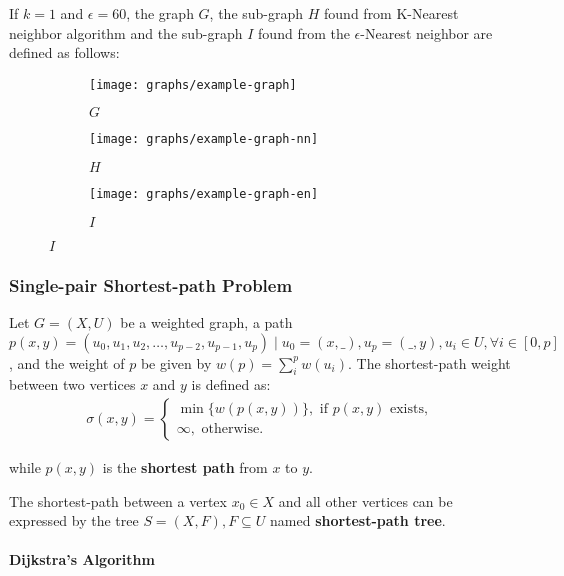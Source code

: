 \begin{example}
	If $k=1$ and $\epsilon=60$, the graph $G$, the sub-graph $H$ found from K-Nearest neighbor algorithm and the sub-graph $I$ found from the $\epsilon$-Nearest neighbor are defined as follows:
	\begin{figure}[H]
		\begin{subfigure}{.33\linewidth}
			\centering
			\texttt{[image: graphs/example-graph]}
			\caption{$G$}
			\label{fig:example-graph}
		\end{subfigure}%
		\begin{subfigure}{.33\linewidth}
			\centering
			\texttt{[image: graphs/example-graph-nn]}
			\caption{$H$}
			\label{fig:example-graph-nn}
		\end{subfigure}%
		\begin{subfigure}{.33\linewidth}
			\centering
			\texttt{[image: graphs/example-graph-en]}
			\caption{$I$}
			\label{fig:example-graph-en}
		\end{subfigure}
	\end{figure}
\end{example}

\subsubsection{Single-pair Shortest-path Problem \cite{cor2011}}

Let $G=(X, U)$ be a weighted graph, a path $p(x, y)=(u_0, u_1, u_2, \dots, u_{p-2}, u_{p-1}, u_{p}) \mid u_0 = (x, \_), u_p = (\_, y), u_i \in U, \forall i \in [0, p]$, and the weight of $p$ be given by $w(p) = \sum_i^p w(u_i)$. The shortest-path weight between two vertices $x$ and $y$ is defined as:
\begin{align*}
	\sigma(x, y) = \begin{cases}
		\min \{w(p(x, y))\}, \text{ if $p(x, y)$ exists}, \\
		\infty, \text{ otherwise.}
	\end{cases}
\end{align*}

while $p(x, y)$ is the \textbf{shortest path} from $x$ to $y$.

The shortest-path between a vertex $x_0 \in X$ and all other vertices can be expressed by the tree $S=(X, F), F \subseteq U$ named \textbf{shortest-path tree}.

\paragraph{Dijkstra's Algorithm \cite{cor2011}}

